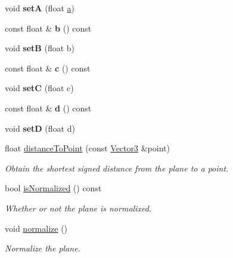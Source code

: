 \begin{Indent}
\begin{DoxyCompactItemize}
void {\bfseries setA} (float \mbox{\hyperlink{classrev_1_1_bounding_plane_a9fe6865adc6e641264a8e64c82f3a01d}{a}})
\item 
\mbox{\label{classrev_1_1_bounding_plane_a93be272ae85cd456e979b3a8d4ad7c8e}} 
const float \& {\bfseries b} () const
\item 
\mbox{\label{classrev_1_1_bounding_plane_a266b15a49bfc5eb0cceb02b22dbc98ca}} 
void {\bfseries setB} (float b)
\item 
\mbox{\label{classrev_1_1_bounding_plane_a8b1ecde6ffefa783384d723cc7d25b36}} 
const float \& {\bfseries c} () const
\item 
\mbox{\label{classrev_1_1_bounding_plane_adb430c0a7f4059a137855b7f5eff5b25}} 
void {\bfseries setC} (float c)
\item 
\mbox{\label{classrev_1_1_bounding_plane_a6ef39436f59635e6d97de0a0ca91cadc}} 
const float \& {\bfseries d} () const
\item 
\mbox{\label{classrev_1_1_bounding_plane_a0a7951e00e8183027e11e94b4cc9f6b6}} 
void {\bfseries setD} (float d)
\item 
\mbox{\label{classrev_1_1_bounding_plane_a6e739026a83c94e1f799053148878bf1}} 
float \mbox{\hyperlink{classrev_1_1_bounding_plane_a6e739026a83c94e1f799053148878bf1}{distance\+To\+Point}} (const \mbox{\hyperlink{classrev_1_1_vector}{Vector3}} \&point)
\begin{DoxyCompactList}\small\item\em Obtain the shortest signed distance from the plane to a point. \end{DoxyCompactList}\item 
\mbox{\label{classrev_1_1_bounding_plane_aa8bceef74382b2f29d54cc7ccc8a5b02}} 
bool \mbox{\hyperlink{classrev_1_1_bounding_plane_aa8bceef74382b2f29d54cc7ccc8a5b02}{is\+Normalized}} () const
\begin{DoxyCompactList}\small\item\em Whether or not the plane is normalixed. \end{DoxyCompactList}\item 
\mbox{\label{classrev_1_1_bounding_plane_a26b4bcb9507ccf5f63aa390825a2e978}} 
void \mbox{\hyperlink{classrev_1_1_bounding_plane_a26b4bcb9507ccf5f63aa390825a2e978}{normalize}} ()
\begin{DoxyCompactList}\small\item\em Normalize the plane. \end{DoxyCompactList}\end{DoxyCompactItemize}
\end{Indent}
